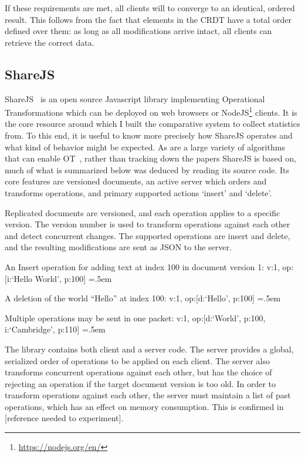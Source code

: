 \documentclass[12pt,a4paper,twoside,openright]{report}
\newenvironment{lcverbatim}
 {\SaveVerbatim{cverb}}
 {\endSaveVerbatim
  \flushleft\fboxrule=0pt\fboxsep=.5em
  \colorbox{cverbbg}{%
    \makebox[\dimexpr\linewidth-2\fboxsep][l]{\BUseVerbatim{cverb}}%
  }
  \endflushleft
}
\begin{document}
	If these requirements are met, all clients will to converge to an identical, ordered result. This follows from the fact that elements in the CRDT have a total order defined over them: as long as all modifications arrive intact, all clients can retrieve the correct data.

	\subsection{ShareJS}
	
	ShareJS~\cite{sharejs} is an open source Javascript library implementing Operational Transformations which can be deployed on web browsers or NodeJS\footnote{\url{https://nodejs.org/en/}} clients. It is the core resource around which I built the comparative system to collect statistics from. To this end, it is useful to know more precisely how ShareJS operates and what kind of behavior might be expected. As are a large variety of algorithms that can enable OT~\cite{kumawat2016}, rather than tracking down the papers ShareJS is based on, much of what is summarized below was deduced by reading its source code. Its core features are versioned documents, an active server which orders and transforms operations, and primary supported actions `insert' and `delete'.
	
	Replicated documents are versioned, and each operation applies to a specific version. The version number is used to transform operations against each other and detect concurrent changes. The supported operations are insert and delete, and the resulting modifications are sent as JSON to the server.
	
	An Insert operation for adding text at index 100 in document version 1:
\begin{lcverbatim}
{v:1, op:[{i:`Hello World', p:100}]}
\end{lcverbatim}

	A deletion of the world ``Hello'' at index 100:
\begin{lcverbatim}
{v:1, op:[{d:`Hello', p:100}]}
\end{lcverbatim}

	Multiple operations may be sent in one packet:
\begin{lcverbatim}
{v:1, op:[{d:`World', p:100}, {i:`Cambridge', p:110}]}
\end{lcverbatim}

\vspace{5mm}

	The library contains both client and a server code. The server provides a global, serialized order of operations to be applied on each client. The server also transforms concurrent operations against each other, but has the choice of rejecting an operation if the target document version is too old. In order to transform operations against each other, the server must maintain a list of past operations, which has an effect on memory consumption. This is confirmed in [reference needed to experiment].
	
\end{document}
